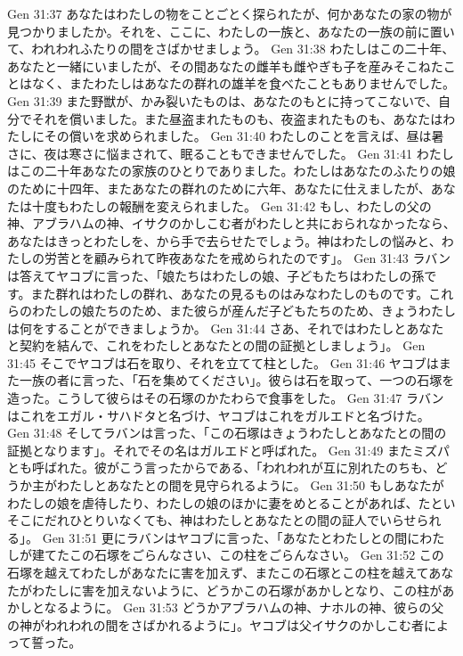 Gen 31:37  あなたはわたしの物をことごとく探られたが、何かあなたの家の物が見つかりましたか。それを、ここに、わたしの一族と、あなたの一族の前に置いて、われわれふたりの間をさばかせましょう。
Gen 31:38  わたしはこの二十年、あなたと一緒にいましたが、その間あなたの雌羊も雌やぎも子を産みそこねたことはなく、またわたしはあなたの群れの雄羊を食べたこともありませんでした。
Gen 31:39  また野獣が、かみ裂いたものは、あなたのもとに持ってこないで、自分でそれを償いました。また昼盗まれたものも、夜盗まれたものも、あなたはわたしにその償いを求められました。
Gen 31:40  わたしのことを言えば、昼は暑さに、夜は寒さに悩まされて、眠ることもできませんでした。
Gen 31:41  わたしはこの二十年あなたの家族のひとりでありました。わたしはあなたのふたりの娘のために十四年、またあなたの群れのために六年、あなたに仕えましたが、あなたは十度もわたしの報酬を変えられました。
Gen 31:42  もし、わたしの父の神、アブラハムの神、イサクのかしこむ者がわたしと共におられなかったなら、あなたはきっとわたしを、から手で去らせたでしょう。神はわたしの悩みと、わたしの労苦とを顧みられて昨夜あなたを戒められたのです」。
Gen 31:43  ラバンは答えてヤコブに言った、「娘たちはわたしの娘、子どもたちはわたしの孫です。また群れはわたしの群れ、あなたの見るものはみなわたしのものです。これらのわたしの娘たちのため、また彼らが産んだ子どもたちのため、きょうわたしは何をすることができましょうか。
Gen 31:44  さあ、それではわたしとあなたと契約を結んで、これをわたしとあなたとの間の証拠としましょう」。
Gen 31:45  そこでヤコブは石を取り、それを立てて柱とした。
Gen 31:46  ヤコブはまた一族の者に言った、「石を集めてください」。彼らは石を取って、一つの石塚を造った。こうして彼らはその石塚のかたわらで食事をした。
Gen 31:47  ラバンはこれをエガル・サハドタと名づけ、ヤコブはこれをガルエドと名づけた。
Gen 31:48  そしてラバンは言った、「この石塚はきょうわたしとあなたとの間の証拠となります」。それでその名はガルエドと呼ばれた。
Gen 31:49  またミズパとも呼ばれた。彼がこう言ったからである、「われわれが互に別れたのちも、どうか主がわたしとあなたとの間を見守られるように。
Gen 31:50  もしあなたがわたしの娘を虐待したり、わたしの娘のほかに妻をめとることがあれば、たといそこにだれひとりいなくても、神はわたしとあなたとの間の証人でいらせられる」。
Gen 31:51  更にラバンはヤコブに言った、「あなたとわたしとの間にわたしが建てたこの石塚をごらんなさい、この柱をごらんなさい。
Gen 31:52  この石塚を越えてわたしがあなたに害を加えず、またこの石塚とこの柱を越えてあなたがわたしに害を加えないように、どうかこの石塚があかしとなり、この柱があかしとなるように。
Gen 31:53  どうかアブラハムの神、ナホルの神、彼らの父の神がわれわれの間をさばかれるように」。ヤコブは父イサクのかしこむ者によって誓った。
